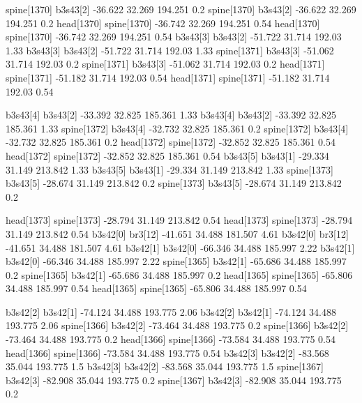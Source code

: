 spine[1370]    b3s43[2]    -36.622    32.269    194.251    0.2
spine[1370]    b3s43[2]    -36.622    32.269    194.251    0.2
head[1370]    spine[1370]    -36.742    32.269    194.251    0.54
head[1370]    spine[1370]    -36.742    32.269    194.251    0.54
b3s43[3]    b3s43[2]    -51.722    31.714    192.03    1.33
b3s43[3]    b3s43[2]    -51.722    31.714    192.03    1.33
spine[1371]    b3s43[3]    -51.062    31.714    192.03    0.2
spine[1371]    b3s43[3]    -51.062    31.714    192.03    0.2
head[1371]    spine[1371]    -51.182    31.714    192.03    0.54
head[1371]    spine[1371]    -51.182    31.714    192.03    0.54


b3s43[4]    b3s43[2]    -33.392    32.825    185.361    1.33
b3s43[4]    b3s43[2]    -33.392    32.825    185.361    1.33
spine[1372]    b3s43[4]    -32.732    32.825    185.361    0.2
spine[1372]    b3s43[4]    -32.732    32.825    185.361    0.2
head[1372]    spine[1372]    -32.852    32.825    185.361    0.54
head[1372]    spine[1372]    -32.852    32.825    185.361    0.54
b3s43[5]    b3s43[1]    -29.334    31.149    213.842    1.33
b3s43[5]    b3s43[1]    -29.334    31.149    213.842    1.33
spine[1373]    b3s43[5]    -28.674    31.149    213.842    0.2
spine[1373]    b3s43[5]    -28.674    31.149    213.842    0.2


head[1373]    spine[1373]    -28.794    31.149    213.842    0.54
head[1373]    spine[1373]    -28.794    31.149    213.842    0.54
b3s42[0]    br3[12]    -41.651    34.488    181.507    4.61
b3s42[0]    br3[12]    -41.651    34.488    181.507    4.61
b3s42[1]    b3s42[0]    -66.346    34.488    185.997    2.22
b3s42[1]    b3s42[0]    -66.346    34.488    185.997    2.22
spine[1365]    b3s42[1]    -65.686    34.488    185.997    0.2
spine[1365]    b3s42[1]    -65.686    34.488    185.997    0.2
head[1365]    spine[1365]    -65.806    34.488    185.997    0.54
head[1365]    spine[1365]    -65.806    34.488    185.997    0.54


b3s42[2]    b3s42[1]    -74.124    34.488    193.775    2.06
b3s42[2]    b3s42[1]    -74.124    34.488    193.775    2.06
spine[1366]    b3s42[2]    -73.464    34.488    193.775    0.2
spine[1366]    b3s42[2]    -73.464    34.488    193.775    0.2
head[1366]    spine[1366]    -73.584    34.488    193.775    0.54
head[1366]    spine[1366]    -73.584    34.488    193.775    0.54
b3s42[3]    b3s42[2]    -83.568    35.044    193.775    1.5
b3s42[3]    b3s42[2]    -83.568    35.044    193.775    1.5
spine[1367]    b3s42[3]    -82.908    35.044    193.775    0.2
spine[1367]    b3s42[3]    -82.908    35.044    193.775    0.2


